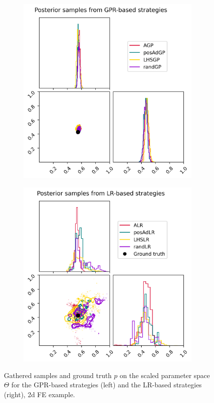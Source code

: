 \begin{figure}[H]
    \begin{subfigure}[h]{0.45\linewidth}
    \includegraphics[width=\linewidth]{results/pictures/d2/GP_corner.png}
    \end{subfigure}
    \hfill
    \begin{subfigure}[h]{0.45\linewidth}
    \includegraphics[width=\linewidth]{results/pictures/d2/LR_corner.png}
    \end{subfigure}%
    \caption{Gathered samples and ground truth $p$ on the scaled parameter space $\Theta$ for the GPR-based strategies (left) and the LR-based strategies (right), 2d FE example.}
    \label{fig:FE-samples}
\end{figure}


